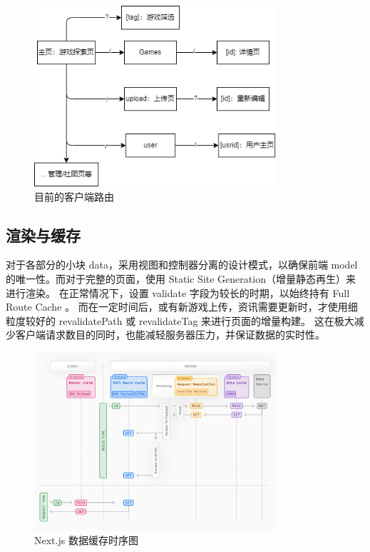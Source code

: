 \documentclass[12pt]{ctexart} %
\begin{document}
\begin{figure}[H]
  \centering
  \includegraphics[width=0.8\textwidth]{Client-arch.png}
  \caption{目前的客户端路由}
\end{figure}


\subsection{渲染与缓存}

对于各部分的小块 data，采用视图和控制器分离的设计模式，以确保前端 model 的唯一性。而对于完整的页面，使用 Static Site Generation（增量静态再生）来进行渲染。
在正常情况下，设置 validate 字段为较长的时期，以始终持有 Full Route Cache 。 而在一定时间后，或有新游戏上传，资讯需要更新时，才使用细粒度较好的 revalidatePath 或 revalidateTag 来进行页面的增量构建。
这在极大减少客户端请求数目的同时，也能减轻服务器压力，并保证数据的实时性。

\begin{figure}[H]
  \centering
  \includegraphics[width=0.8\textwidth]{Next-Cache.png}
  \caption{Next.js 数据缓存时序图}
\end{figure}
\end{document}
